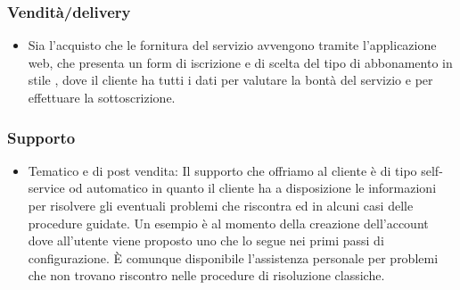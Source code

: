 \subsubsection{Vendità/delivery}
\begin{itemize}
\item Sia l'acquisto che le fornitura del servizio avvengono tramite l'applicazione web, che presenta un form di iscrizione e di scelta del tipo di abbonamento in stile , dove il cliente ha tutti i dati per valutare la bontà del servizio e per effettuare la sottoscrizione.
\end{itemize}

\subsubsection{Supporto}
\begin{itemize}
\item Tematico e di post vendita: Il supporto che offriamo al cliente è di tipo self-service od automatico in quanto il cliente ha a disposizione le informazioni per risolvere gli eventuali problemi che riscontra ed in alcuni casi delle procedure guidate. Un esempio è al momento della creazione dell'account dove all'utente viene proposto uno  che lo segue nei primi passi di configurazione. È	 comunque disponibile l'assistenza personale per problemi che non trovano riscontro nelle procedure di risoluzione classiche.
\end{itemize}

